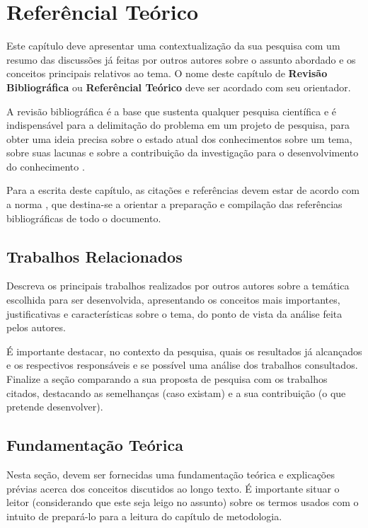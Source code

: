 \chapter{Referêncial Teórico} \label{RevisaoBibliografica}

Este capítulo deve apresentar uma contextualização da sua pesquisa com um resumo das discussões já feitas por outros autores sobre o assunto abordado e os conceitos principais relativos ao tema. O nome deste capítulo  de \textbf{Revisão Bibliográfica} ou \textbf{Referêncial Teórico} deve ser acordado com seu orientador.

A revisão bibliográfica é a base que sustenta qualquer pesquisa científica e  é indispensável para a delimitação do problema em um projeto de pesquisa,  para obter uma ideia precisa sobre o estado atual dos conhecimentos sobre um tema, sobre suas lacunas e sobre a contribuição da investigação para o desenvolvimento do conhecimento \cite{marconi2003}. 

Para a escrita deste capítulo, as citações e referências devem estar de acordo com a norma \cite{NBR6023:2002}, que destina-se a orientar a preparação e compilação das  referências bibliográficas de todo o documento.

\section{Trabalhos Relacionados}

Descreva os principais trabalhos realizados por outros autores sobre a temática escolhida para ser desenvolvida, apresentando os conceitos mais importantes, justificativas e características sobre o tema, do ponto de vista da análise feita pelos autores. 

É importante destacar, no contexto da pesquisa, quais os resultados já alcançados e os respectivos responsáveis e se possível uma análise  dos trabalhos consultados. Finalize a seção comparando a sua proposta de pesquisa com os trabalhos citados, destacando as semelhanças (caso existam) e a sua contribuição (o que pretende desenvolver).


\section{Fundamentação Teórica}

Nesta seção, devem ser fornecidas uma fundamentação teórica e explicações prévias acerca dos conceitos discutidos ao longo texto. É importante situar o leitor (considerando que este seja leigo no assunto) sobre os termos usados com o intuito de prepará-lo para a leitura do capítulo de metodologia.

